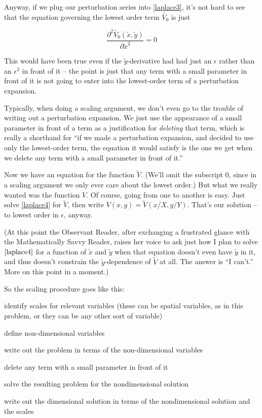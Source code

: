 \documentclass[11pt]{book}
\begin{document}
Anyway, if we plug our perturbation series into \eqref{laplace3}, it's not hard to see that the equation governing the lowest order term $\tilde{V_0}$ is just

\begin{equation}\frac{\partial^2 \tilde{V_0}(\tilde{x},\tilde{y})}{\partial \tilde{x}^2} = 0\label{laplace4}\end{equation}

This would have been true even if the $\tilde{y}$-derivative had had just an $\epsilon$ rather than an $\epsilon^2$ in front of it -- the point is just that any term with a small parameter in front of it is not going to enter into the lowest-order term of a perturbation expansion.

Typically, when doing a scaling argument, we don't even go to the trouble of writing out a perturbation expansion.  We just use the appearance of a small parameter in front of a term as a justification for \emph{deleting} that term, which is really a shorthand for ``if we made a perturbation expansion, and decided to use only the lowest-order term, the equation it would satisfy is the one we get when we delete any term with a small parameter in front of it.''

Now we have an equation for the function $\tilde{V}$.  (We'll omit the subscript 0, since in a scaling argument we only ever care about the lowest order.)  But what we really wanted was the function $V$.  Of course, going from one to another is easy.  Just solve \eqref{laplace4} for $\tilde{V}$, then write $V(x,y) = \tilde{V}(x/X, y/Y)$.  That's our solution -- to lowest order in $\epsilon$, anyway.

(At this point the Observant Reader, after exchanging a frustrated glance with the Mathematically Savvy Reader, raises her voice to ask just how I plan to solve $\eqref{laplace4}$ for a function of $\tilde{x}$ and $\tilde{y}$ when that equation doesn't even have $\tilde{y}$ in it, and thus doesn't constrain the $\tilde{y}$-dependence of $\tilde{V}$ at all.  The answer is ``I can't.''  More on this point in a moment.)

So the scaling procedure goes like this: \begin{enumerate}\item{identify scales for relevant variables (these can be spatial variables, as in this problem, or they can be any other sort of variable) \item{define non-dimensional variables} \item{write out the problem in terms of the non-dimensional variables} \item{delete any term with a small parameter in front of it} \item{solve the resulting problem for the nondimensional solution} \item{write out the dimensional solution in terms of the nondimensional solution and the scales}}\end{enumerate}
\end{document}
